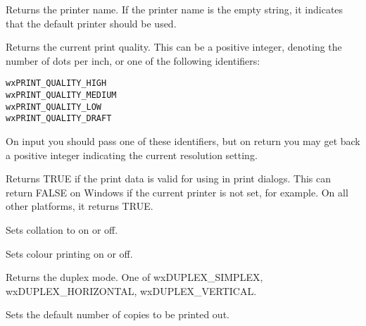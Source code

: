 Returns the printer name. If the printer name is the empty string, it indicates that the default
printer should be used.

\label{wxprintdatagetquality}


Returns the current print quality. This can be a positive integer, denoting the number of dots per inch, or
one of the following identifiers:

\begin{verbatim}
wxPRINT_QUALITY_HIGH
wxPRINT_QUALITY_MEDIUM
wxPRINT_QUALITY_LOW
wxPRINT_QUALITY_DRAFT
\end{verbatim}

On input you should pass one of these identifiers, but on return you may get back a positive integer
indicating the current resolution setting.

\label{wxprintdataok}


Returns TRUE if the print data is valid for using in print dialogs.
This can return FALSE on Windows if the current printer is not set, for example.
On all other platforms, it returns TRUE.

\label{wxprintdatasetcollate}


Sets collation to on or off.

\label{wxprintdatasetcolour}


Sets colour printing on or off.

\label{wxprintdatasetduplex}


Returns the duplex mode. One of wxDUPLEX\_SIMPLEX, wxDUPLEX\_HORIZONTAL, wxDUPLEX\_VERTICAL.

\label{wxprintdatasetnocopies}


Sets the default number of copies to be printed out.

\label{wxprintdatasetorientation}

